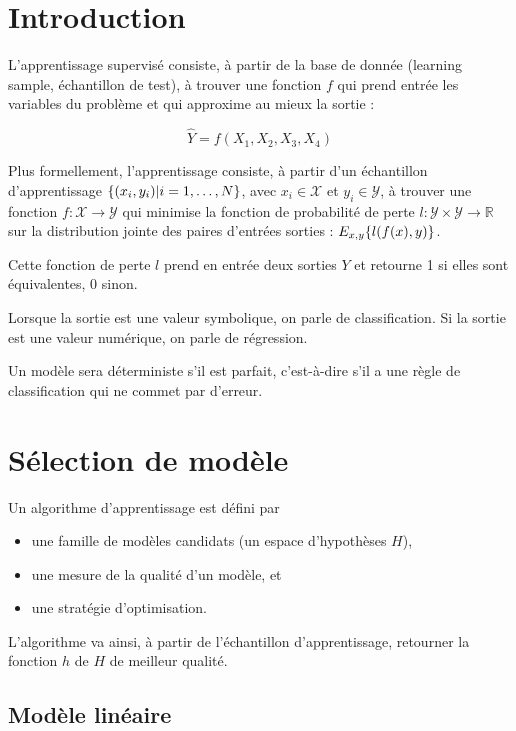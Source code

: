 \section{Introduction}
L'apprentissage supervisé consiste, à partir de la base de donnée (learning sample, échantillon de test), à trouver une fonction $f$ qui prend entrée les variables du problème et qui approxime au mieux la sortie :

$$\hat{Y} = f(X_1, X_2, X_3, X_4)$$

Plus formellement, l'apprentissage consiste, à partir d'un échantillon d'apprentissage $\lbrace (x_i, y_i) \vert i = 1, \dots , N \rbrace$, avec $x_i \in \mathcal{X}$ et $y_i \in \mathcal{Y}$, à trouver une fonction $f : \mathcal{X} \rightarrow \mathcal{Y}$ qui minimise la fonction de probabilité de perte $l : \mathcal{Y} \times \mathcal{Y} \rightarrow \mathbb{R}$ sur la distribution jointe des paires d'entrées sorties : $E_{x, y} \lbrace l(f(x), y) \rbrace$.

Cette fonction de perte $l$ prend en entrée deux sorties $Y$ et retourne 1 si elles sont équivalentes, 0 sinon.

Lorsque la sortie est une valeur symbolique, on parle de classification. Si la sortie est une valeur numérique, on parle de régression.

Un modèle sera déterministe s'il est parfait, c'est-à-dire s'il a une règle de classification qui ne commet par d'erreur.

\section{Sélection de modèle}

Un algorithme d'apprentissage est défini par

\begin{itemize}
\item une famille de modèles candidats (un espace d'hypothèses $H$),
\item une mesure de la qualité d'un modèle, et
\item une stratégie d'optimisation.
\end{itemize}

L'algorithme va ainsi, à partir de l'échantillon d'apprentissage, retourner la fonction $h$ de $H$ de meilleur qualité.

\subsection{Modèle linéaire}

